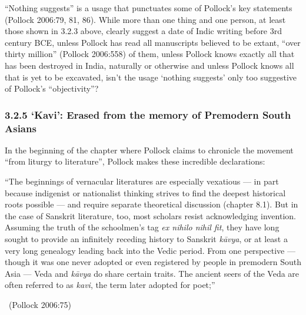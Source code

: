 “Nothing suggests” is a usage that punctuates some of Pollock’s key statements (Pollock 2006:79, 81, 86). While more than one thing and one person, at least those shown in 3.2.3 above, clearly suggest a date of Indic writing before 3rd century BCE, unless Pollock has read all manuscripts believed to be extant, “over thirty million” (Pollock 2006:558) of them, unless Pollock knows exactly all that has been destroyed in India, naturally or otherwise and unless Pollock knows all that is yet to be excavated, isn’t the usage ‘nothing suggests’ only too suggestive of Pollock’s “objectivity”?


\subsubsection*{3.2.5 ‘Kavi’: Erased from the memory of Premodern South Asians}

In the beginning of the chapter where Pollock claims to chronicle the movement “from liturgy to literature”, Pollock makes these incredible declarations:

\begin{myquote}
“The beginnings of vernacular literatures are especially vexatious — in part because indigenist or nationalist thinking strives to find the deepest historical roots possible — and require separate theoretical discussion (chapter 8.1). But in the case of Sanskrit literature, too, most scholars resist acknowledging invention. Assuming the truth of the schoolmen’s tag \textit{ex nihilo nihil fit}, they have long sought to provide an infinitely receding history to Sanskrit \textit{kāvya}, or at least a very long genealogy leading back into the Vedic period. From one perspective — though it was one never adopted or even registered by people in premodern South Asia — Veda and \textit{kāvya} do share certain traits. The ancient seers of the Veda are often referred to as \textit{kavi}, the term later adopted for poet;” 

~\hfill (Pollock 2006:75)
\end{myquote}

